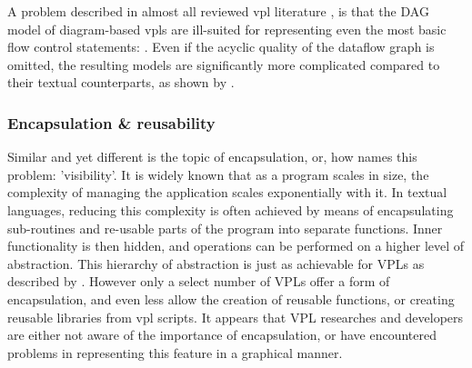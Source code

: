 A problem described in almost all reviewed vpl literature \citep{green_usability_1996,sousa_dataflow_2012, kuhail_characterizing_2021}, is that the \ac{DAG} model of diagram-based vpls are ill-suited for representing even the most basic flow control statements: .
Even if the acyclic quality of the dataflow graph is omitted, the resulting models are significantly more complicated compared to their textual counterparts, as shown by .

\subsubsection*{Encapsulation \& reusability}
Similar and yet different is the topic of encapsulation, or, how \citet{green_usability_1996} names this problem: 'visibility'.
It is widely known that as a program scales in size, the complexity of managing the application scales exponentially with it.
In textual languages, reducing this complexity is often achieved by means of encapsulating sub-routines and re-usable parts of the program into separate functions.
Inner functionality is then hidden, and operations can be performed on a higher level of abstraction. 
This hierarchy of abstraction is just as achievable for \ac{VPL}s as described by \citet{sousa_dataflow_2012}.
However only a select number of \ac{VPL}s offer a form of encapsulation, and even less allow the creation of reusable functions, or creating reusable libraries from vpl scripts.
It appears that \ac{VPL} researches and developers are either not aware of the importance of encapsulation, or have encountered problems in representing this feature in a graphical manner.


